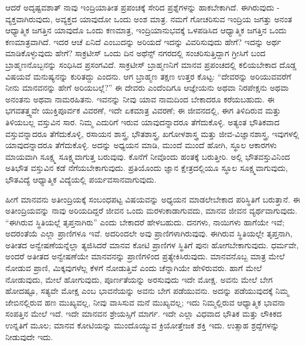 ಆದರೆ ಅದೃಷ್ಟವಶಾತ್ ನಾವು ಇಂದ್ರಿಯಾತೀತ ಪ್ರಪಂಚಕ್ಕೆ ಸೇರಿದ ಪ್ರಶ್ನೆಗಳನ್ನು ಹಾಕಬೇಕಾಗಿದೆ. ಈಗಿರುವುದು - ವ್ಯಕ್ತವಾಗಿರುವುದು, ಅವ್ಯಕ್ತದ ಯಾವುದೋ ಒಂದು ಅಂಶ ಮಾತ್ರ. ನಮಗೆ ಗೋಚರಿಸುವ ಇಂದ್ರಿಯ ಜಗತ್ತು ಅನಂತ ಆಧ್ಯಾತ್ಮಿಕ ಜಗತ್ತಿನ ಯಾವುದೊ ಒಂದು ಕಣಮಾತ್ರ, ಇಂದ್ರಿಯಾನುಭವಕ್ಕೆ ಒಳಪಡಿಸಿದ ಆಧ್ಯಾತ್ಮಿಕ ಜಗತ್ತಿನ ಒಂದು ಕಣಮಾತ್ರವಾಗಿದೆ. ಇದರ ಆಚೆ ಏನಿದೆ ಎಂಬುದನ್ನು ಅರಿಯದೆ ಇದನ್ನು ವಿವರಿಸುವುದು ಹೇಗೆ? ಇದನ್ನು ಅರ್ಥ ಮಾಡಿಕೊಳ್ಳುವುದು ಹೇಗೆ? ಸಾಕ್ರಟೀಸ್ ಒಂದು ದಿನ ಅಥೆನ್ಸ್ ನಗರದಲ್ಲಿ ಸಂಚರಿಸುತ್ತಿದ್ದಾಗ ಗ್ರೀಸಿಗೆ ಬಂದ ಬ್ರಾಹ್ಮಣನೊಬ್ಬನನ್ನು ಸಂಧಿಸಿದ ಪ್ರಸಂಗವಿದೆ. ಸಾಕ್ರಟೀಸ್ ಬ್ರಾಹ್ಮಣನಿಗೆ ಮಾನವ ಪ್ರಪಂಚದಲ್ಲಿ ಕಲಿಯಬೇಕಾದ ದೊಡ್ಡ ವಿಷಯವೆ ಮನುಷ್ಯನನ್ನು ಕುರಿತದ್ದು ಎಂದನು. ಆಗ ಬ್ರಾಹ್ಮಣ ತಕ್ಷಣ ಉತ್ತರ ಕೊಟ್ಟ: “ದೇವರನ್ನು ಅರಿಯುವವರೆಗೆ ನೀನು ಮಾನವನನ್ನು ಹೇಗೆ ಅರಿಯಬಲ್ಲೆ?” ಈ ದೇವರು ಎಂದೆಂದಿಗೂ ಆಜ್ಞೇಯನು ಅಥವಾ ನಿರಪೇಕ್ಷನು ಅಥವಾ ಅನಂತನು ಅಥವಾ ನಾಮರಹಿತನು. ಇವನನ್ನು ನೀವು ಯಾವ ನಾಮದಿಂದ ಬೇಕಾದರೂ ಕರೆಯಬಹುದು. ಈ ಭಗವತತ್ತ್ವವೇ ಯುಕ್ತಿಪೂರ್ವಕ ವಿವರಣೆ, ಇದೇ ಏಕಮಾತ್ರ ವಿವರಣೆ; ಈ ಜೀವನದಲ್ಲಿ, ಈಗ ತಿಳಿದಿರುವ ಮತ್ತು ತಿಳಿಯಬಲ್ಲ ವಸ್ತುವಿನ ಸಾರ. ನಿಮ್ಮ ಎದುರಿಗೆ ಇರುವ ಯಾವುದನ್ನಾದರೂ ತೆಗೆದುಕೊಳ್ಳಿ. ಅತ್ಯಂತ ಭೌತಿಕವಾದ ವಸ್ತುವನ್ನಾದರೂ ತೆಗೆದುಕೊಳ್ಳಿ, ರಸಾಯನ ಶಾಸ್ತ್ರ, ಭೌತಶಾಸ್ತ್ರ, ಖಗೋಳಶಾಸ್ತ್ರ ಮತ್ತು ಜೀವ-ವಿಜ್ಞಾನಶಾಸ್ತ್ರ, ಇವುಗಳಲ್ಲಿ ಯಾವುದನ್ನಾದರೂ ತೆಗೆದುಕೊಳ್ಳಿ. ಅದನ್ನು ಅಧ್ಯಯನ ಮಾಡಿ, ಮುಂದೆ ಮುಂದೆ ಹೋಗಿ, ಸ್ಥೂಲ ಆಕಾರಗಳು ಮಾಯವಾಗಿ ಸೂಕ್ಷ್ಮ ಸೂಕ್ಷ್ಮವಾಗುತ್ತ ಬರುವುವು. ಕೊನೆಗೆ ನೀವೊಂದು ಹಂತಕ್ಕೆ ಬರುತ್ತೀರಿ. ಅಲ್ಲಿ ಭೌತವಸ್ತುವಿನಿಂದ ಅತಿಭೌತ ವಸ್ತುವಿನ ಕಡೆ ನೆಗೆಯಬೇಕಾಗುವುದು. ಪ್ರತಿಯೊಂದು ಜ್ಞಾನ ಕ್ಷೇತ್ರದಲ್ಲಿಯೂ ಸ್ಥೂಲ ಸೂಕ್ಷ್ಮವಾಗುವುದು, ಭೌತವಿದ್ಯೆ ಆಧ್ಯಾತ್ಮಿಕ ವಿದ್ಯೆಯಲ್ಲಿ ಪರ್ಯವಸಾನವಾಗುವುದು.

ಹೀಗೆ ಮಾನವನು ಅತೀಂದ್ರಿಯಕ್ಕೆ ಸಂಬಂಧಪಟ್ಟ ವಿಷಯವನ್ನು ಅಧ್ಯಯನ ಮಾಡಲೇಬೇಕಾದ ಪರಿಸ್ಥಿತಿಗೆ ಬರುತ್ತಾನೆ. ಈ ಅತೀಂದ್ರಿಯವನ್ನು ನಾವು ಅರಿಯದಿದ್ದರೆ ಜೀವನ ಒಂದು ಮರಳುಕಾಡಾಗುವದು, ಮಾನವ ಜೀವನ ವ್ಯರ್ಥವಾಗುವುದು. “ಈಗಿರುವ ಸ್ಥಿತಿಯಲ್ಲೆ ತೃಪ್ತನಾಗಿರು'' ಎಂದು ಬೇಕಾದರೆ ಹೇಳಬಹುದು. ದನಗಳು, ನಾಯಿಗಳು ಹಾಗೆಯೇ ಇವೆ; ಅದರಂತೆಯೆ ಎಲ್ಲಾ ಪ್ರಾಣಿಗಳೂ ಇವೆ. ಅದರಿಂದಲೇ ಅವು ಪ್ರಾಣಿಗಳಾಗಿರುವುವು. ಈಗಿರುವ ಸ್ಥಿತಿಯಲ್ಲೇ ತೃಪ್ತನಾಗಿ, ಅತೀತದ ಅನ್ವೇಷಣೆಯನ್ನೆಲ್ಲಾ ತ್ಯಜಿಸಿದರೆ ಮಾನವ ಕೋಟಿ ಪ್ರಾಣಿಗಳ ಸ್ಥಿತಿಗೆ ಪುನಃ ಹೋಗಬೇಕಾಗುವುದು. ಧರ್ಮವೇ, ಅಂದರೆ ಅತೀತದ ಅನ್ವೇಷಣೆಯೇ ಮಾನವನನ್ನು ಪ್ರಾಣಿಗಳಿಂದ ಪ್ರತ್ಯೇಕಿಸಿರುವುದು. ಮಾನವನೊಬ್ಬ ಮಾತ್ರ ಮೇಲೆ ನೋಡುವ ಪ್ರಾಣಿ, ಮಿಕ್ಕವುಗಳೆಲ್ಲ ಕೆಳಗೆ ನೋಡುತ್ತಿವೆ ಎಂದು ಚೆನ್ನಾಗಿಯೇ ಹೇಳಿರುವರು. ಹಾಗೆ ಮೇಲೆ ನೋಡುವುದು, ಮೇಲೆ ಹೋಗುವುದು, ಪೂರ್ಣತೆಯನ್ನು ಅರಸುವುದು ಇದೇ ಮೋಕ್ಷ. ಅವನು ಮೇಲೆ ಬೇಗ ಹೋದಷ್ಟೂ, ಸತ್ಯವೇ ಮೋಕ್ಷ ಎಂಬ ಭಾವನೆಯನ್ನು ಅವನು ಬೇಗ ಪಡೆಯುವನು. ಅದನ್ನು ಪಡೆಯುವುದಕ್ಕೆ ನಿಮ್ಮ ಜೇಬಿನಲ್ಲಿರುವ ಹಣ ಮುಖ್ಯವಲ್ಲ, ನೀವು ವಾಸಿಸುವ ಮನೆ ಮುಖ್ಯವಲ್ಲ; ಇದು ನಿಮ್ಮಲ್ಲಿರುವ ಆಧ್ಯಾತ್ಮಿಕ ಭಾವನಾ ಸಂಪತ್ತಿನ ಮೇಲೆ ಇದೆ. ಇದೇ ಮಾನವನ ಶ್ರೇಯಸ್ಸಿಗೆ ಮಾರ್ಗ. ಇದೇ ಎಲ್ಲಾ ವಿಧವಾದ ಭೌತಿಕ ಮತ್ತು ಲೌಕಿಕದ ಉನ್ನತಿಗೆ ಮೂಲ; ಮಾನವ ಕೋಟಿಯನ್ನು ಮುಂದೊಯ್ಯುವ ಕ್ರಿಯೋತ್ತೇಜಕ ಶಕ್ತಿ ಇದು. ಉತ್ಸಾಹ ಶ್ರದ್ದೆಗಳನ್ನು ನೀಡುವುದೇ ಇದು.

